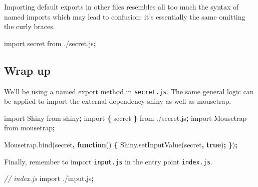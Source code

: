 \documentclass[
]{krantz}
\makeatletter
\newenvironment{Shaded}{\begin{snugshade}}{\end{snugshade}}
\newcommand{\AttributeTok}[1]{\textcolor[rgb]{0.61,0.61,0.61}{#1}}
\newcommand{\CommentTok}[1]{\textcolor[rgb]{0.37,0.37,0.37}{\textit{#1}}}
\newcommand{\ImportTok}[1]{#1}
\newcommand{\KeywordTok}[1]{\textcolor[rgb]{0.27,0.27,0.27}{\textbf{#1}}}
\newcommand{\NormalTok}[1]{#1}
\newcommand{\OperatorTok}[1]{\textcolor[rgb]{0.43,0.43,0.43}{\textbf{#1}}}
\newcommand{\StringTok}[1]{\textcolor[rgb]{0.5,0.5,0.5}{#1}}
\newcommand{\VariableTok}[1]{\textcolor[rgb]{0,0,0}{#1}}
\newenvironment{kframe}{%
\medskip{}
\setlength{\fboxsep}{.8em}
 \def\at@end@of@kframe{}%
 \ifinner\ifhmode%
  \def\at@end@of@kframe{\end{minipage}}%
  \begin{minipage}{\columnwidth}%
 \fi\fi%
 \def\FrameCommand##1{\hskip\@totalleftmargin \hskip-\fboxsep
 \colorbox{shadecolor}{##1}\hskip-\fboxsep
     \hskip-\linewidth \hskip-\@totalleftmargin \hskip\columnwidth}%
 \MakeFramed {\advance\hsize-\width
   \@totalleftmargin\z@ \linewidth\hsize
   \@setminipage}}%
 {\par\unskip\endMakeFramed%
 \at@end@of@kframe}
\renewenvironment{Shaded}{\begin{kframe}}{\end{kframe}}
\makeatother
\begin{document}
Importing default exports in other files resembles all too much the syntax of named imports which may lead to confusion: it's essentially the same omitting the curly braces.

\begin{Shaded}
\begin{Highlighting}[]
\ImportTok{import}\NormalTok{ secret }\ImportTok{from} \StringTok{\textquotesingle{}./secret.js\textquotesingle{}}\OperatorTok{;}
\end{Highlighting}
\end{Shaded}

\hypertarget{webpack-intro-import-export-wrap-up}{%
\subsection{Wrap up}\label{webpack-intro-import-export-wrap-up}}

We'll be using a named export method in \texttt{secret.js}. The same general logic can be applied to import the external dependency shiny as well as mousetrap.

\begin{Shaded}
\begin{Highlighting}[]
\ImportTok{import}\NormalTok{ Shiny }\ImportTok{from} \StringTok{\textquotesingle{}shiny\textquotesingle{}}\OperatorTok{;}
\ImportTok{import} \OperatorTok{\{}\NormalTok{ secret }\OperatorTok{\}} \ImportTok{from} \StringTok{\textquotesingle{}./secret.js\textquotesingle{}}\OperatorTok{;}
\ImportTok{import}\NormalTok{ Mousetrap }\ImportTok{from} \StringTok{\textquotesingle{}mousetrap\textquotesingle{}}\OperatorTok{;}

\VariableTok{Mousetrap}\NormalTok{.}\AttributeTok{bind}\NormalTok{(secret}\OperatorTok{,} \KeywordTok{function}\NormalTok{() }\OperatorTok{\{} 
  \VariableTok{Shiny}\NormalTok{.}\AttributeTok{setInputValue}\NormalTok{(}\StringTok{\textquotesingle{}secret\textquotesingle{}}\OperatorTok{,} \KeywordTok{true}\NormalTok{)}\OperatorTok{;}
\OperatorTok{\}}\NormalTok{)}\OperatorTok{;}
\end{Highlighting}
\end{Shaded}

Finally, remember to import \texttt{input.js} in the entry point \texttt{index.js}.

\begin{Shaded}
\begin{Highlighting}[]
\CommentTok{// index.js}
\ImportTok{import} \StringTok{\textquotesingle{}./input.js\textquotesingle{}}\OperatorTok{;}
\end{Highlighting}
\end{Shaded}
\end{document}
